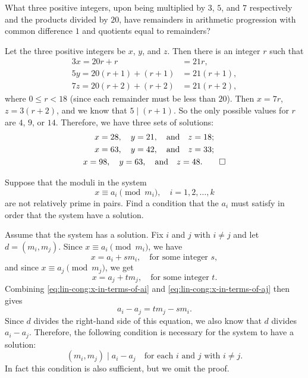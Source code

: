  What three positive integers, upon being multiplied by
$3$, $5$, and $7$ respectively and the products divided by $20$, have
remainders in arithmetic progression with common difference $1$ and
quotients equal to remainders?
\begin{solution}
  Let the three positive integers be $x$, $y$, and $z$. Then there is
  an integer $r$ such that
  \begin{align*}
    3x = 20r + r &= 21r, \\
    5y = 20(r + 1) + (r + 1) &= 21(r + 1), \\
    7z = 20(r + 2) + (r + 2) &= 21(r + 2),
  \end{align*}
  where $0\leq r < 18$ (since each remainder must be less than
  $20$). Then $x = 7r$, $z = 3(r + 2)$, and we know that
  $5\mid (r + 1)$. So the only possible values for $r$ are $4$, $9$,
  or $14$. Therefore, we have three sets of solutions:
  \begin{gather*}
    x = 28, \quad y = 21, \quad\text{and}\quad z = 18; \\
    x = 63, \quad y = 42, \quad\text{and}\quad z = 33; \\
    x = 98, \quad y = 63, \quad\text{and}\quad z = 48. \qedhere
  \end{gather*}
\end{solution}

 Suppose that the moduli in the system
\begin{equation*}
  x\equiv a_i\pmod{m_i},\quad i = 1, 2, \dots, k
\end{equation*}
are not relatively prime in pairs. Find a condition that the $a_i$
must satisfy in order that the system have a solution.
\begin{solution}
  Assume that the system has a solution. Fix $i$ and $j$ with
  $i\neq j$ and let $d = (m_i,m_j)$. Since
  $x\equiv a_i\pmod{m_i}$, we have
  \begin{equation}
    \label{eq:lin-cong:x-in-terms-of-ai}
    x = a_i + sm_i,\quad\text{for some integer $s$},
  \end{equation}
  and since $x\equiv a_j\pmod{m_j}$, we get
  \begin{equation}
    \label{eq:lin-cong:x-in-terms-of-aj}
    x = a_j + tm_j,\quad\text{for some integer $t$}.
  \end{equation}
  Combining \eqref{eq:lin-cong:x-in-terms-of-ai} and
  \eqref{eq:lin-cong:x-in-terms-of-aj} then gives
  \begin{equation*}
    a_i - a_j = tm_j - sm_i.
  \end{equation*}
  Since $d$ divides the right-hand side of this equation, we also know
  that $d$ divides $a_i - a_j$. Therefore, the following condition is
  necessary for the system to have a solution:
  \begin{equation*}
    (m_i, m_j) \mid a_i - a_j
    \quad\text{for each $i$ and $j$ with $i\neq j$.}
  \end{equation*}
  In fact this condition is also sufficient, but we omit the proof.
\end{solution}

